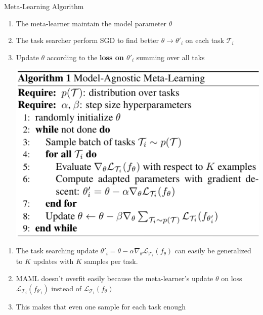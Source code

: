 \documentclass[compress]{beamer}
\begin{document}
\begin{frame}[allowframebreaks]{Meta-Learning Algorithm}
    \begin{enumerate}
        \item The meta-learner maintain the model parameter $\theta$
        \item The task searcher perform SGD to find better $\theta\rightarrow\theta'_i$ on each task $\mathcal{T}_i$
        \item Update $\theta$ according to the \textbf{loss on $\theta'_i$} summing over all taks
            \begin{center}
                \includegraphics[height=.6\textheight]{alg1}
            \end{center}
    \end{enumerate}

    \begin{enumerate}
        \item The task searching update $\theta'_i=\theta-\alpha\nabla_{\theta}\mathcal{L}_{\mathcal{T}_i}(f_{\theta})$ can easily be generalized to $K$ updates with $K$ samples per task.
        \item MAML doesn't overfit easily because the meta-learner's update $\theta$ on loss $\mathcal{L}_{\mathcal{T}_i}(f_{\theta'_i})$ instead of $\mathcal{L}_{\mathcal{T}_i}(f_{\theta})$
        \item This makes that even one sample for each task enough
    \end{enumerate}


\end{frame}
\end{document}
